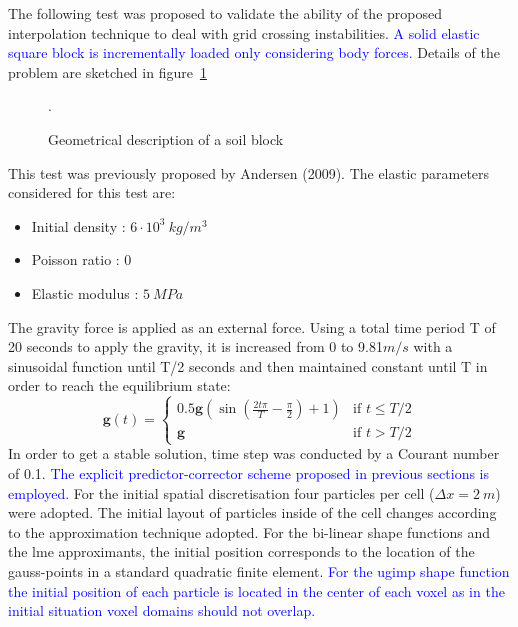 \documentclass[preprint,12pt,a4paper]{elsarticle}
\begin{document}
The following test was proposed to validate the ability of the proposed
interpolation technique to deal with grid crossing instabilities. \textcolor{blue}{A solid elastic square block is incrementally loaded only considering body forces.} Details of the problem are sketched in figure~\ref{fig:block}
\begin{figure}
  \centering
  \resizebox{0.7\hsize}{!}{
    }
  \caption{Geometrical description of a soil block }.
  \label{fig:block}
\end{figure}
This test was previously proposed by Andersen (2009)\cite{thesis_Andersen_2009}. The
elastic parameters considered for this test are: 
\begin{itemize} 
\item  Initial density : $6\cdot 10^3\ kg/m^3$
\item  Poisson ratio : $0$
\item  Elastic modulus : $5\ MPa$
\end{itemize}
The gravity force is applied as an external force. Using a total time period T of 20 seconds to apply the gravity, it is increased from 0 to 9.81$m/s$
with a sinusoidal function until T/2 seconds and then maintained constant until T
in order to reach the equilibrium state:
\begin{equation}
  \label{eq:gravity-load-block}
 \mathbf{g}(t) = \left\{
    \begin{array}{ll}
      0.5 \mathbf{g} (\sin(\frac{2t \pi}{T} - \frac{\pi}{2})+1)  & \mbox{if } t \leq T/2 \\
      \mathbf{g} & \mbox{if } t > T/2
    \end{array}
  \right.
\end{equation}
In order to get a stable solution, time step was conducted by a
Courant number of 0.1. \textcolor{blue}{The explicit
predictor-corrector scheme proposed in previous sections is employed.} For the initial spatial discretisation four particles per cell
($\Delta x = 2\ m$) were adopted. The initial layout of particles inside of the
cell changes according to the approximation technique adopted. For the
bi-linear shape functions and the \acrshort{lme} approximants, the initial
position corresponds to the location of the gauss-points in a standard
quadratic finite element. \textcolor{blue}{For the \acrshort{ugimp} shape function the initial
position of each particle is located in the center of each voxel as in the initial situation voxel domains should not overlap.}
\end{document}
